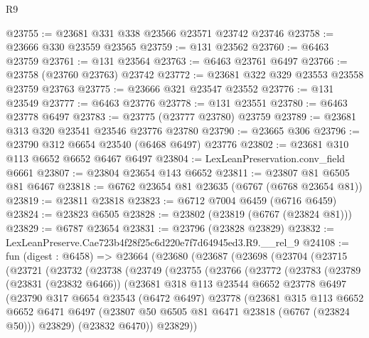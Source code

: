 \begin{lexlean}{R9}
\begin{coremodule}
@23755 := @23681 @331 @338 @23566 @23571 @23742 @23746
@23758 := @23666 @330 @23559 @23565
@23759 := @131 @23562
@23760 := @6463 @23759
@23761 := @131 @23564
@23763 := @6463 @23761 @6497
@23766 := @23758 (@23760 @23763) @23742
@23772 := @23681 @322 @329 @23553 @23558 @23759 @23763
@23775 := @23666 @321 @23547 @23552
@23776 := @131 @23549
@23777 := @6463 @23776
@23778 := @131 @23551
@23780 := @6463 @23778 @6497
@23783 := @23775 (@23777 @23780) @23759
@23789 := @23681 @313 @320 @23541 @23546 @23776 @23780
@23790 := @23665 @306
@23796 := @23790 @312 @6654 @23540 (@6468 @6497) @23776
@23802 := @23681 @310 @113 @6652 @6652 @6467 @6497
@23804 := LexLeanPreservation.conv_field @6661
@23807 := @23804 @23654 @143 @6652
@23811 := @23807 @81 @6505 @81 @6467
@23818 := @6762 @23654 @81 @23635 (@6767 (@6768 @23654 @81))
@23819 := @23811 @23818
@23823 := @6712 @7004 @6459 (@6716 @6459)
@23824 := @23823 @6505
@23828 := @23802 (@23819 (@6767 (@23824 @81)))
@23829 := @6787 @23654
@23831 := @23796 (@23828 @23829)
@23832 := LexLeanPreserve.Cae723b4f28f25c6d220e7f7d64945ed3.R9.__rel_9
@24108 := fun (digest : @6458) =>
  @23664
    (@23680
      (@23687
        (@23698
          (@23704
            (@23715
              (@23721
                (@23732
                  (@23738
                    (@23749
                      (@23755
                        (@23766
                          (@23772
                            (@23783
                              (@23789
                                (@23831 (@23832 @6466))
                                (@23681
                                  @318
                                  @113
                                  @23544
                                  @6652
                                  @23778
                                  @6497
                                  (@23790
                                    @317
                                    @6654
                                    @23543
                                    (@6472 @6497)
                                    @23778
                                    (@23681
                                      @315
                                      @113
                                      @6652
                                      @6652
                                      @6471
                                      @6497
                                      (@23807 @50 @6505 @81 @6471 @23818 (@6767 (@23824 @50)))
                                      @23829)
                                    (@23832 @6470))
                                  @23829))

\end{coremodule}
\end{lexlean}
